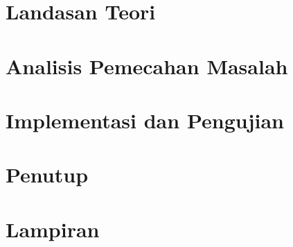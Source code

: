 \documentclass[12pt,a4paper]{report}
\begin{document}
\chapter{Landasan Teori}


\chapter{Analisis Pemecahan Masalah}


\chapter{Implementasi dan Pengujian}


\chapter{Penutup}


\chapter{Lampiran}



\nocite{*}

\end{document}
